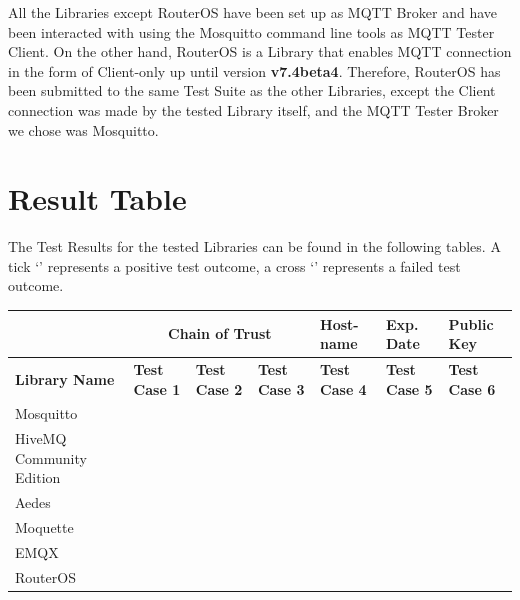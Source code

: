 \documentclass[binding=0.6cm,noexaminfo]{sapthesis}
\newcommand{\cmark}{\ding{51}}%
\newcommand{\xmark}{\ding{55}}%
\begin{document}
All the Libraries except RouterOS have been set up as MQTT Broker and have been interacted with using the Mosquitto command line tools as MQTT Tester Client. On the other hand, RouterOS is a Library that enables MQTT connection in the form of Client-only up until version \textbf{v7.4beta4}. Therefore, RouterOS has been submitted to the same Test Suite as the other Libraries, except the Client connection was made by the tested Library itself, and the MQTT Tester Broker we chose was Mosquitto.

\newpage
\section{Result Table}
The Test Results for the tested Libraries can be found in the following tables. A tick `\cmark' represents a positive test outcome, a cross `\xmark' represents a failed test outcome.

\begin{flushleft}
\begin{tabular}{| p{2cm} | p{1.5cm} | p{1.5cm} | p{1.5cm} | p{1.5cm} | p{1.5cm} | p{1.5cm} |}
\hline
 & \multicolumn{3}{|c|}{\bf Chain of Trust} & \bf Host- name & \bf Exp. Date & \bf Public Key \\
\hline
\bf Library Name & \bf Test Case 1 & \bf Test Case 2 & \bf Test Case 3 & \bf Test Case 4 & \bf Test Case 5 & \bf Test Case 6 \\
\hline
Mosquitto & \cmark & \cmark & \cmark & \cmark & \cmark & \cmark  \\
\hline
HiveMQ Community Edition & \cmark & \cmark & \cmark & \cmark & \cmark & \cmark  \\
\hline
Aedes & \cmark & \cmark & \cmark & \cmark & \cmark & \cmark  \\
\hline
Moquette & \cmark & \cmark & \cmark & \cmark & \cmark & \cmark  \\
\hline
EMQX & \cmark & \cmark & \cmark & \cmark & \cmark & \cmark  \\
\hline
RouterOS & \cmark & \cmark & \cmark & \cmark & \cmark & \cmark  \\
\hline
\end{tabular}
\end{flushleft}
\end{document}
